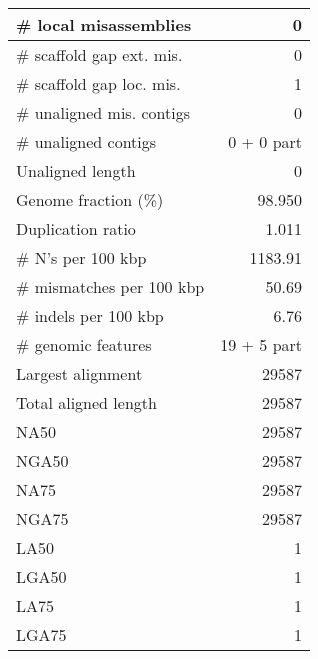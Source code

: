 \documentclass[12pt,a4paper]{article}
\begin{document}
\begin{table}[ht]
\begin{center}
\begin{tabular}{|l*{1}{|r}|}
\# local misassemblies & 0 \\ \hline
\# scaffold gap ext. mis. & 0 \\ \hline
\# scaffold gap loc. mis. & 1 \\ \hline
\# unaligned mis. contigs & 0 \\ \hline
\# unaligned contigs & 0 + 0 part \\ \hline
Unaligned length & 0 \\ \hline
Genome fraction (\%) & 98.950 \\ \hline
Duplication ratio & 1.011 \\ \hline
\# N's per 100 kbp & 1183.91 \\ \hline
\# mismatches per 100 kbp & 50.69 \\ \hline
\# indels per 100 kbp & 6.76 \\ \hline
\# genomic features & 19 + 5 part \\ \hline
Largest alignment & 29587 \\ \hline
Total aligned length & 29587 \\ \hline
NA50 & 29587 \\ \hline
NGA50 & 29587 \\ \hline
NA75 & 29587 \\ \hline
NGA75 & 29587 \\ \hline
LA50 & 1 \\ \hline
LGA50 & 1 \\ \hline
LA75 & 1 \\ \hline
LGA75 & 1 \\ \hline
\end{tabular}
\end{center}
\end{table}
\end{document}
